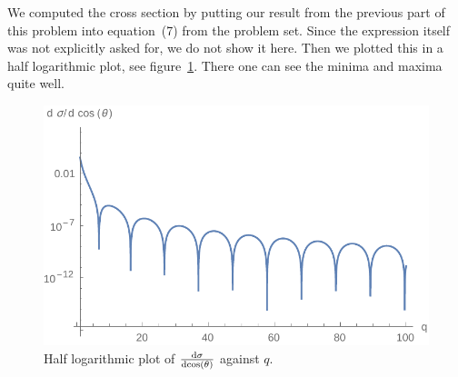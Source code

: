 \documentclass[11pt, english, fleqn, DIV=15, headinclude, BCOR=1.5cm]{scrartcl}
\begin{document}
We computed the cross section by putting our result from the previous part of
this problem into equation~(7) from the problem set. Since the expression
itself was not explicitly asked for, we do not show it here. Then we plotted
this in a half logarithmic plot, see figure~\ref{fig:logplot}. There one can
see the minima and maxima quite well.

\begin{figure}[htbp]
    \centering
    \includegraphics[width=.7\linewidth]{logplot.pdf}
    \caption{%
        Half logarithmic plot of $\frac{\mathop{}\!\mathrm d {\sigma}}{\mathop{}\!\mathrm d {\cos(\theta)}}$ against $q$.
    }
    \label{fig:logplot}
\end{figure}
\end{document}
